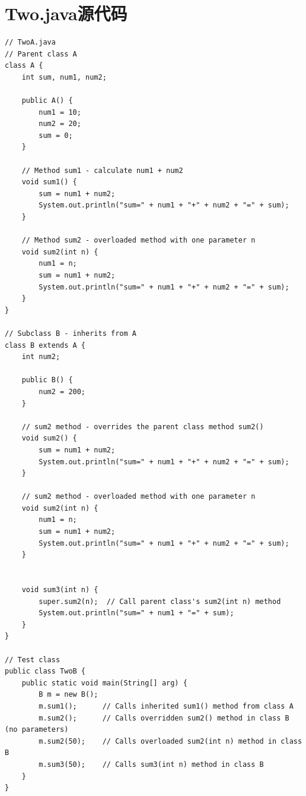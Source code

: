 \documentclass[12pt,a4paper]{article}
\begin{document}
\section*{Two.java源代码}\label{sec:two}
\begin{lstlisting}
// TwoA.java
// Parent class A
class A {
    int sum, num1, num2;
    
    public A() {
        num1 = 10;
        num2 = 20;
        sum = 0;
    }
    
    // Method sum1 - calculate num1 + num2
    void sum1() {
        sum = num1 + num2;
        System.out.println("sum=" + num1 + "+" + num2 + "=" + sum);
    }
    
    // Method sum2 - overloaded method with one parameter n
    void sum2(int n) {
        num1 = n;
        sum = num1 + num2;
        System.out.println("sum=" + num1 + "+" + num2 + "=" + sum);
    }
}

// Subclass B - inherits from A
class B extends A {
    int num2;  
    
    public B() {
        num2 = 200; 
    }
    
    // sum2 method - overrides the parent class method sum2()
    void sum2() {
        sum = num1 + num2;
        System.out.println("sum=" + num1 + "+" + num2 + "=" + sum);
    }
    
    // sum2 method - overloaded method with one parameter n
    void sum2(int n) {
        num1 = n;
        sum = num1 + num2;
        System.out.println("sum=" + num1 + "+" + num2 + "=" + sum);
    }
    

    void sum3(int n) {
        super.sum2(n);  // Call parent class's sum2(int n) method
        System.out.println("sum=" + num1 + "=" + sum);
    }
}

// Test class
public class TwoB {
    public static void main(String[] arg) {
        B m = new B();
        m.sum1();      // Calls inherited sum1() method from class A
        m.sum2();      // Calls overridden sum2() method in class B (no parameters)
        m.sum2(50);    // Calls overloaded sum2(int n) method in class B
        m.sum3(50);    // Calls sum3(int n) method in class B
    }
}

\end{lstlisting}
\end{document}
